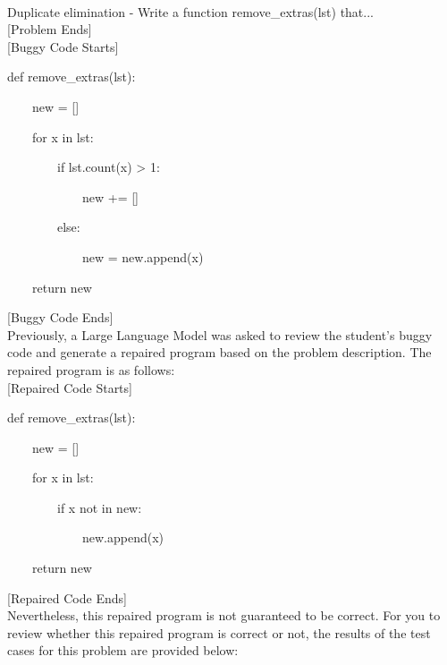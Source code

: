 \documentclass{article}
\begin{document}
\begin{figure*}[h!]
    \centering
    \begin{tcolorbox}[colframe=black!10!white, colback=black!5!white]
        \begin{minipage}{\textwidth}
            \\
            Duplicate elimination - Write a function remove\_extras(lst) that...
            \texttt{\\}
            [Problem Ends]\\
                        
            [Buggy Code Starts]

            def remove\_extras(lst):

            $\quad\quad$new = []

            $\quad\quad$for x in lst:

            $\quad\quad$$\quad\quad$if lst.count(x) > 1:

            $\quad\quad$$\quad\quad$$\quad\quad$new += []

            $\quad\quad$$\quad\quad$else:

            $\quad\quad$$\quad\quad$$\quad\quad$new = new.append(x)

            $\quad\quad$return new
                
            [Buggy Code Ends]\\
            
            Previously, a Large Language Model was asked to review the student's buggy code and generate a repaired program based on the problem description. The repaired program is as follows:\\
            
            [Repaired Code Starts]

            def remove\_extras(lst):

            $\quad\quad$new = []

            $\quad\quad$for x in lst:

            $\quad\quad$$\quad\quad$if x not in new:

            $\quad\quad$$\quad\quad$$\quad\quad$new.append(x)

            $\quad\quad$return new

            [Repaired Code Ends]\\
            
            Nevertheless, this repaired program is not guaranteed to be correct. For you to review whether this repaired program is correct or not, the results of the test cases for this problem are provided below:\\
            

\end{minipage}
\end{tcolorbox}
\end{figure*}
\end{document}
